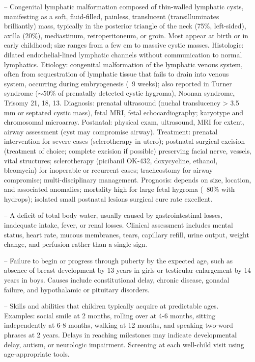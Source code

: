 -- Congenital lymphatic malformation composed of thin-walled lymphatic cysts, manifesting as a soft, fluid-filled, painless, translucent (transilluminates brilliantly) mass, typically in the posterior triangle of the neck (75\%, left-sided), axilla (20\%), mediastinum, retroperitoneum, or groin. Most appear at birth or in early childhood; size ranges from a few cm to massive cystic masses. Histologic: dilated endothelial-lined lymphatic channels without communication to normal lymphatics. Etiology: congenital malformation of the lymphatic venous system, often from sequestration of lymphatic tissue that fails to drain into venous system, occurring during embryogenesis (~9 weeks); also reported in Turner syndrome ($\sim 50\%$ of prenatally detected cystic hygroma), Noonan syndrome, Trisomy 21, 18, 13. Diagnosis: prenatal ultrasound (nuchal translucency > 3.5 mm or septated cystic mass), fetal MRI, fetal echocardiography; karyotype and chromosomal microarray. Postnatal: physical exam, ultrasound, MRI for extent, airway assessment (cyst may compromise airway). Treatment: prenatal intervention for severe cases (sclerotherapy in utero); postnatal surgical excision (treatment of choice; complete excision if possible) preserving facial nerve, vessels, vital structures; sclerotherapy (picibanil OK-432, doxycycline, ethanol, bleomycin) for inoperable or recurrent cases; tracheostomy for airway compromise; multi-disciplinary management. Prognosis: depends on size, location, and associated anomalies; mortality high for large fetal hygroma (~80\% with hydrops); isolated small postnatal lesions surgical cure rate excellent.

-- A deficit of total body water, usually caused by gastrointestinal losses, inadequate intake, fever, or renal losses. Clinical assessment includes mental status, heart rate, mucous membranes, tears, capillary refill, urine output, weight change, and perfusion rather than a single sign.

-- Failure to begin or progress through puberty by the expected age, such as absence of breast development by 13 years in girls or testicular enlargement by 14 years in boys. Causes include constitutional delay, chronic disease, gonadal failure, and hypothalamic or pituitary disorders.

-- Skills and abilities that children typically acquire at predictable ages. Examples: social smile at 2 months, rolling over at 4-6 months, sitting independently at 6-8 months, walking at 12 months, and speaking two-word phrases at 2 years. Delays in reaching milestones may indicate developmental delay, autism, or neurologic impairment. Screening at each well-child visit using age-appropriate tools.

